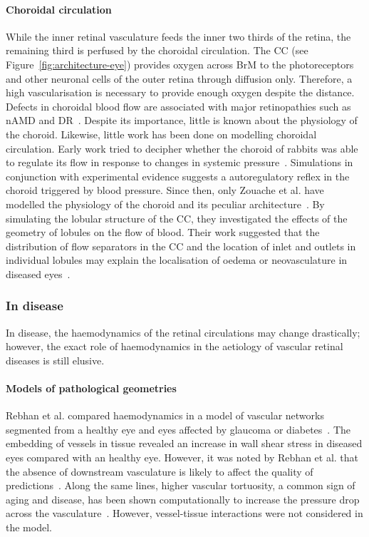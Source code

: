 \documentclass{article}
\begin{document}
\paragraph*{Choroidal circulation}
While the inner retinal vasculature feeds the inner two thirds of the retina, the remaining third is perfused by the choroidal circulation.
The CC (see Figure~\ref{fig:architecture-eye}) provides oxygen across BrM to the photoreceptors and other neuronal cells of the outer retina through diffusion only.
Therefore, a high vascularisation is necessary to provide enough oxygen despite the distance.
Defects in choroidal blood flow are associated with major retinopathies such as nAMD and DR~\cite{Pemp_2008}.
Despite its importance, little is known about the physiology of the choroid.
Likewise, little work has been done on modelling choroidal circulation.
Early work tried to decipher whether the choroid of rabbits was able to regulate its flow in response to changes in systemic pressure~\cite{Kiel_1992}.
Simulations in conjunction with experimental evidence suggests a autoregulatory reflex in the choroid triggered by blood pressure.
Since then, only Zouache et al. have modelled the physiology of the choroid and its peculiar architecture~\cite{Zouache_2015,Zouache_2016}.
By simulating the lobular structure of the CC, they investigated the effects of the geometry of lobules on the flow of blood.
Their work suggested that the distribution of flow separators in the CC and the location of inlet and outlets in individual lobules may explain the localisation of oedema or neovasculature in diseased eyes~\cite{Zouache_2015}.


\subsubsection{In disease}

In disease, the haemodynamics of the retinal circulations may change drastically; however, the exact role of haemodynamics in the aetiology of vascular retinal diseases is still elusive.

\paragraph*{Models of pathological geometries} 

Rebhan et al. compared haemodynamics in a model of vascular networks segmented from a healthy eye and eyes affected by glaucoma or diabetes~\cite{Rebhan_2019}.
The embedding of vessels in tissue revealed an increase in wall shear stress in diseased eyes compared with an healthy eye.
However, it was noted by Rebhan et al. that the absence of downstream vasculature is likely to affect the quality of predictions~\cite{Rebhan_2019}.
Along the same lines, higher vascular tortuosity, a common sign of aging and disease, has been shown computationally to increase the pressure drop across the vasculature~\cite{Malek_2014}.
However, vessel-tissue interactions were not considered in the model.
\end{document}
